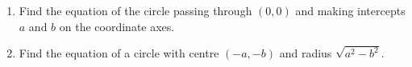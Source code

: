 \begin{enumerate}[label=\thesubsection.\arabic*,ref=\thesubsection.\theenumi]
  \item Find the equation of the circle passing through $(0,0)$ and making intercepts $a$ and $b$ on the coordinate axes.
  \item Find the equation of a circle with centre $(-a,-b)$ and radius $\sqrt{a^{2}-b^{2}}$.
	 \\
		\solution
\label{chapters/11/11/1/5}

\end{enumerate}
